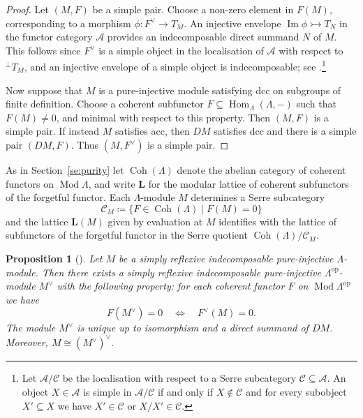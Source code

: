 \documentclass[a4paper]{amsart}
\theoremstyle{plain}
\newtheorem{prop}[thm]{Proposition}
\theoremstyle{definition}
\theoremstyle{remark}
\numberwithin{equation}{section}
\newcommand{\Coh}{\operatorname{Coh}}
\newcommand{\Hom}{\operatorname{Hom}}
\renewcommand{\Im}{\operatorname{Im}}
\newcommand{\Mod}{\operatorname{Mod}}
\newcommand{\op}{\mathrm{op}}
\def\A{\mathcal A}
\def\C{\mathcal C}
\def\bfL{\mathbf L}
\def\bfL{\mathbf L}
\begin{document}
\begin{proof}
Let $(M,F)$ be a simple pair. Choose a non-zero element in $F(M)$, corresponding to a morphism $\phi\colon F^\vee\to T_M$. An injective envelope $\Im\phi\rightarrowtail T_N$ in the functor category $\A$ provides an indecomposable direct summand $N$ of $M$. This follows since $F^\vee$ is a simple object in the localisation of $\A$ with respect to $^\perp{T_M}$, and an injective envelope of a simple object is indecomposable; see \cite[Chap.~III, Proposition~6]{Ga1962}.\footnote{
Let $\A/\C$ be the localisation with respect to a Serre subcategory $\C\subseteq\A$. An object $X\in\A$ is simple in $\A/\C$ if and only if $X\not\in\C$ and for every subobject $X'\subseteq X$ we have $X'\in\C$ or $X/X'\in\C$.
}
  
Now suppose that $M$ is a pure-injective module satisfying dcc on subgroups of finite definition. Choose a coherent subfunctor $F\subseteq \Hom_\Lambda(\Lambda,-)$ such that $F(M)\neq 0$, and minimal with respect to this property. Then $(M,F)$ is a simple pair.  If instead $M$ satisfies acc, then $DM$ satisfies dcc and there is a simple pair $(DM,F)$. Thus $(M,F^\vee)$ is a simple pair.
\end{proof}

As in Section~\ref{se:purity} let $\Coh(\Lambda)$ denote the abelian category of coherent functors on $\Mod \Lambda$, and write $\bfL$ for the modular lattice of coherent subfunctors of the forgetful functor. Each $\Lambda$-module $M$ determines a Serre subcategory
\[ \C_M \coloneqq \{ F \in \Coh(\Lambda) \mid F(M)=0 \} \]
and the lattice $\bfL(M)$ given by evaluation at $M$ identifies with the lattice of subfunctors of the forgetful functor in the Serre quotient $\Coh(\Lambda)/\C_M$.

\begin{prop}[\cite{He1993,Kr1997}]\label{pr:duality}
Let $M$ be a simply reflexive indecomposable pure-injective $\Lambda$-module. Then there exists a simply reflexive indecomposable pure-in\-jec\-tive $\Lambda^\op$-module $M^\vee$ with the following property: for each coherent functor $F$ on $\Mod\Lambda^\op$ we have
\[ F(M^\vee) = 0 \quad \iff \quad F^\vee(M)=0. \]
The module $M^\vee$ is unique up to isomorphism and a direct summand of $DM$. Moreover, $M\cong (M^\vee)^\vee$.
\end{prop}
\end{document}

